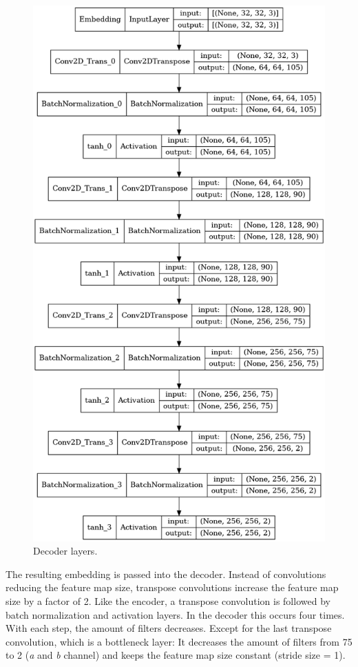 \documentclass[a4paper,12pt, listof=totoc,toc=sectionentrywithdots]{scrartcl}
\begin{document}
\begin{figure}[h]
\begin{minipage}[b]{0.4\textwidth}
    \includegraphics[width=\textwidth]{Figures/DecoderLayer.png}
    \caption{Decoder layers.}
    \label{fig:DecoderLayer}
  \end{minipage}
\end{figure}


The resulting embedding is passed into the decoder.
Instead of convolutions reducing the feature map size, transpose convolutions increase the feature map size by a factor of 2.
Like the encoder, a transpose convolution is followed by batch normalization and activation layers.
In the decoder this occurs four times.
With each step, the amount of filters decreases.
Except for the last transpose convolution, which is a bottleneck layer:
It decreases the amount of filters from 75 to 2 (\textit{a} and \textit{b} channel) and keeps the feature map size constant (stride size = 1).
\end{document}
